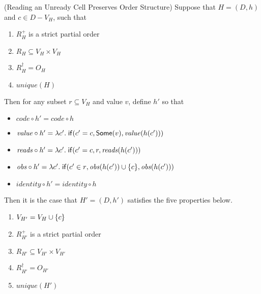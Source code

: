 \begin{lemma}{(Reading an Unready Cell Preserves Order Structure)}
Suppose that $H = (D,h)$ and $c \in D - V_H$, such that  
\begin{enumerate}
\item $R^+_{H}$ is a strict partial order 
\item $R_{H} \subseteq V_{H} \times V_{H}$
\item $R^\dagger_{H} = O_{H}$ 
\item $\mathit{unique}(H)$
\end{enumerate}


Then for any subset $r
\subseteq V_H$ and value $v$, define $h'$ so that
\begin{itemize}
\item $\mathit{code} \circ h' = \mathit{code} \circ h$ 
\item $\mathit{value} \circ h' = \lambda c'.\;\mathsf{if}({c' = c}, {\mathsf{Some}(v)}, {\mathit{value}(h(c'))})$ 
\item $\mathit{reads} \circ h' = \lambda c'.\;\mathsf{if}({c' = c}, {r}, {\mathit{reads}(h(c'))})$ 
\item $\mathit{obs} \circ h' = \lambda c'.\;\mathsf{if}({c' \in r}, {\mathit{obs}(h(c')) \cup \{{c}\}}, {\mathit{obs}(h(c'))})$ 
\item $\mathit{identity} \circ h' = \mathit{identity} \circ h$
\end{itemize}
\noindent Then it is the case that $H' = (D,h')$ satisfies the five properties below. 
\begin{enumerate}
\item $V_{H'} = V_H \cup \{{c}\}$
\item $R^+_{H'}$ is a strict partial order 
\item $R_{H'} \subseteq V_{H'} \times V_{H'}$
\item $R^\dagger_{H'} = O_{H'}$ 
\item $\mathit{unique}(H')$
\end{enumerate}
\end{lemma}

